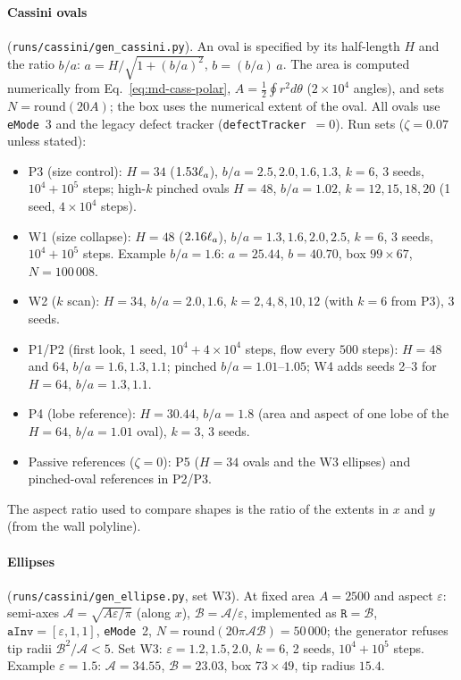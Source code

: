 \paragraph{Cassini ovals} (\texttt{runs/cassini/gen\_cassini.py}). An oval is specified by its half-length $H$ and the ratio $b/a$:
$a=H/\sqrt{1+(b/a)^2}$, $b=(b/a)\,a$. The area is computed numerically from Eq.~\eqref{eq:md-cass-polar},
$A=\tfrac12\oint r^2d\theta$ ($2\times10^4$ angles), and sets $N=\mathrm{round}(20A)$; the box uses the numerical extent of the
oval. All ovals use \texttt{eMode}~3 and the legacy defect tracker (\texttt{defectTracker}~$=0$). Run sets ($\zeta=0.07$ unless stated):
\begin{itemize}
\item P3 (size control): $H=34$ ($1.53\ell_a$), $b/a=2.5,2.0,1.6,1.3$, $k=6$, 3 seeds, $10^4+10^5$ steps;
  high-$k$ pinched ovals $H=48$, $b/a=1.02$, $k=12,15,18,20$ (1 seed, $4\times10^4$ steps).
\item W1 (size collapse): $H=48$ ($2.16\ell_a$), $b/a=1.3,1.6,2.0,2.5$, $k=6$, 3 seeds, $10^4+10^5$ steps.
  Example $b/a=1.6$: $a=25.44$, $b=40.70$, box $99\times67$, $N=100\,008$.
\item W2 ($k$ scan): $H=34$, $b/a=2.0,1.6$, $k=2,4,8,10,12$ (with $k=6$ from P3), 3 seeds.
\item P1/P2 (first look, 1 seed, $10^4+4\times10^4$ steps, flow every $500$ steps): $H=48$ and $64$, $b/a=1.6,1.3,1.1$;
  pinched $b/a=1.01$--$1.05$; W4 adds seeds 2--3 for $H=64$, $b/a=1.3,1.1$.
\item P4 (lobe reference): $H=30.44$, $b/a=1.8$ (area and aspect of one lobe of the $H=64$, $b/a=1.01$ oval), $k=3$, 3 seeds.
\item Passive references ($\zeta=0$): P5 ($H=34$ ovals and the W3 ellipses) and pinched-oval references in P2/P3.
\end{itemize}
The aspect ratio used to compare shapes is the ratio of the extents in $x$ and $y$ (from the wall polyline).

\paragraph{Ellipses} (\texttt{runs/cassini/gen\_ellipse.py}, set W3). At fixed area $A=2500$ and aspect $\varepsilon$:
semi-axes $\mathcal A=\sqrt{A\varepsilon/\pi}$ (along $x$), $\mathcal B=\mathcal A/\varepsilon$, implemented as
$\texttt{R}=\mathcal B$, $\texttt{aInv}=[\varepsilon,1,1]$, \texttt{eMode}~2, $N=\mathrm{round}(20\pi\mathcal A\mathcal B)=50\,000$;
the generator refuses tip radii $\mathcal B^2/\mathcal A<5$. Set W3: $\varepsilon=1.2,1.5,2.0$, $k=6$, 2 seeds, $10^4+10^5$ steps.
Example $\varepsilon=1.5$: $\mathcal A=34.55$, $\mathcal B=23.03$, box $73\times49$, tip radius $15.4$.

